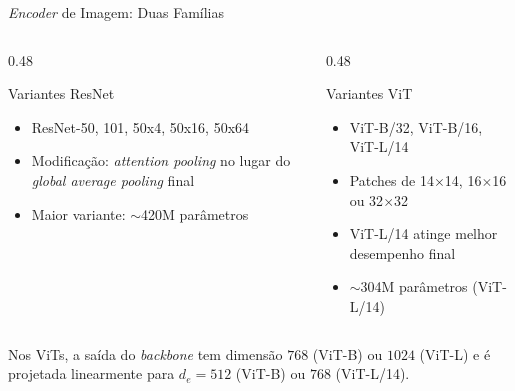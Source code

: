 \documentclass[aspectratio=169,xcolor=dvipsnames]{beamer}
\begin{document}
  \begin{frame}{\textit{Encoder} de Imagem: Duas Famílias}
    \begin{columns}[T]
      \begin{column}{0.48\textwidth}
        \begin{block}{Variantes ResNet}
          \begin{itemize}
            \item ResNet-50, 101, 50x4, 50x16, 50x64
            \item Modificação: \textit{attention pooling} no lugar do \textit{global average pooling} final
            \item Maior variante: $\sim$420M parâmetros
          \end{itemize}
        \end{block}
      \end{column}
      \begin{column}{0.48\textwidth}
        \begin{block}{Variantes ViT}
          \begin{itemize}
            \item ViT-B/32, ViT-B/16, ViT-L/14
            \item Patches de 14$\times$14, 16$\times$16 ou 32$\times$32
            \item ViT-L/14 atinge melhor desempenho final
            \item $\sim$304M parâmetros (ViT-L/14)
          \end{itemize}
        \end{block}
      \end{column}
    \end{columns}

    \vspace{0.5em}
    Nos ViTs, a saída do \textit{backbone} tem dimensão $768$ (ViT-B) ou $1024$ (ViT-L)
    e é projetada linearmente para $d_e = 512$ (ViT-B) ou $768$ (ViT-L/14).
  \end{frame}
\end{document}
